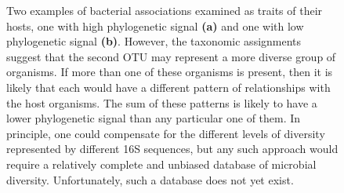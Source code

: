 \begin{figure}
    \caption{Two examples of bacterial associations examined as traits of their hosts, one with high phylogenetic signal \textbf{(a)} and one with low phylogenetic signal \textbf{(b)}. However, the taxonomic assignments suggest that the second OTU may represent a more diverse group of organisms. If more than one of these organisms is present, then it is likely that each would have a different pattern of relationships with the host organisms. The sum of these patterns is likely to have a lower phylogenetic signal than any particular one of them. In principle, one could compensate for the different levels of diversity represented by different 16S sequences, but any such approach would require a relatively complete and unbiased database of microbial diversity. Unfortunately, such a database does not yet exist.}
    \label{fig:my_label}
\end{figure}